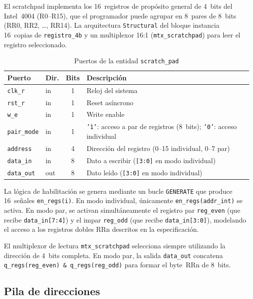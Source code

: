 \documentclass[%
    school=etsisi,%
    type=pfg,%
    degree=61CI,%
]{upm-report}
\newcommand{\vhdlfile}[1]{%
    \par\noindent{\small\sffamily\color{gray}Fichero: \texttt{#1}}\par\smallskip
}
\begin{document}
El \gls{scratchpad} implementa los 16~registros de propósito general de 4~bits
del Intel~4004 (R0--R15), que el programador puede agrupar en 8~pares de 8~bits
(RR0, RR2, \ldots, RR14).  La arquitectura \texttt{Structural} del bloque
instancia 16~copias de \texttt{registro\_4b} y un multiplexor 16:1
(\texttt{mtx\_scratchpad}) para leer el registro seleccionado.

\begin{table}[H]
\centering
\caption{Puertos de la entidad \texttt{scratch\_pad}}
\label{tab:scratchpad}
\begin{tabularx}{\textwidth}{@{}llcX@{}}
\toprule
\textbf{Puerto}   & \textbf{Dir.} & \textbf{Bits} & \textbf{Descripción} \\
\midrule
\texttt{clk\_r}    & in  & 1  & Reloj del sistema \\
\texttt{rst\_r}    & in  & 1  & Reset asíncrono \\
\texttt{w\_e}      & in  & 1  & Write enable \\
\texttt{pair\_mode}& in  & 1  & \texttt{'1'}: acceso a par de registros (8~bits); \texttt{'0'}: acceso individual \\
\texttt{address}   & in  & 4  & Dirección del registro (0--15 individual, 0--7 par) \\
\texttt{data\_in}  & in  & 8  & Dato a escribir (\texttt{[3:0]} en modo individual) \\
\texttt{data\_out} & out & 8  & Dato leído (\texttt{[3:0]} en modo individual) \\
\bottomrule
\end{tabularx}
\end{table}

La lógica de habilitación se genera mediante un bucle \texttt{GENERATE} que
produce 16~señales \texttt{en\_regs(i)}.  En modo individual, únicamente
\texttt{en\_regs(addr\_int)} se activa.  En modo par, se activan
simultáneamente el registro par \texttt{reg\_even} (que recibe
\texttt{data\_in[7:4]}) y el impar \texttt{reg\_odd} (que recibe
\texttt{data\_in[3:0]}), modelando el acceso a los registros dobles RRn
descritos en la especificación.

El multiplexor de lectura \texttt{mtx\_scratchpad} selecciona siempre
utilizando la dirección de 4~bits completa.  En modo par, la salida
\texttt{data\_out} concatena \texttt{q\_regs(reg\_even) \& q\_regs(reg\_odd)}
para formar el byte~RRn de 8~bits.

\subsection{Pila de direcciones}
\label{ss:stack}
\vhdlfile{stack\_3L.vhd}
\end{document}

